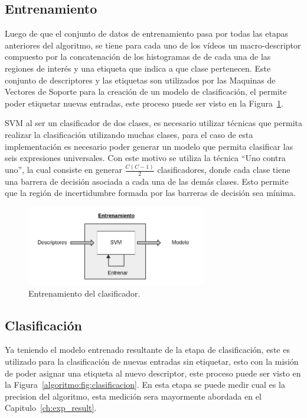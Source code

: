 	\subsection{Entrenamiento}
	\label{algoritmo:entrenamiento}
		Luego de que el conjunto de datos de entrenamiento pasa por todas las etapas anteriores del algoritmo, se tiene para cada uno de los vídeos un macro-descriptor compuesto por la concatenación de los histogramas de de cada una de las regiones de interés y una etiqueta que indica a que clase pertenecen. Este conjunto de descriptores y las etiquetas son utilizados por las Maquinas de Vectores de Soporte para la creación de un modelo de clasificación, el permite poder etiquetar nuevas entradas, este proceso puede ser visto en la Figura~\ref{algoritmo:fig:entrenamiento}.
	
	SVM al ser un clasificador de dos clases, es necesario utilizar técnicas que permita realizar la clasificación utilizando muchas clases, para el caso de esta implementación es necesario poder generar un modelo que permita clasificar las seis expresiones universales. Con este motivo se utiliza la técnica ``Uno contra uno'', la cual consiste en generar $\frac{C(C-1)}{2}$ clasificadores, donde cada clase tiene una barrera de decisión asociada a cada una de las demás clases. Esto permite que la región de incertidumbre formada por las barreras de decisión sea mínima.
		
		
	\begin{figure}[bt]
		\centering
  		\label{algoritmo:fig:entrenamiento}
    		\includegraphics[width=0.7\textwidth]{Figuras/Diagramas/Entrenamiento.png}
  		\caption{Entrenamiento del clasificador.}
	\end{figure}	
		
		
	\subsection{Clasificación}
	\label{algoritmo:clasificacion}
		Ya teniendo el modelo entrenado resultante de la etapa de clasificación, este es utilizado para la clasificación de nuevas entradas sin etiquetar, esto con la misión de poder asignar una etiqueta al nuevo descriptor, este proceso puede ser visto en la Figura~\ref{algoritmo:fig:clasificacion}. En esta etapa se puede medir cual es la precision del algoritmo, esta medición sera mayormente abordada en el Capitulo~\ref{ch:exp_result}.
		
